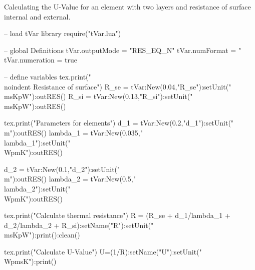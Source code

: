 \documentclass{article}
\newcommand{\msKpW}{\tfrac{m^2K}{W}}
\newcommand{\WpmsK}{\tfrac{W}{m^2K}}
\newcommand{\WpmK}{\tfrac{W}{mK}}
\newcommand{\m}{m}
\begin{document}
Calculating the U-Value for an element with two layers and resistance of surface internal and external.\\

\begin{luacode}
	-- load tVar library
	require("tVar.lua")

	-- global Definitions
	tVar.outputMode = "RES_EQ_N"
	tVar.numFormat = "%
	tVar.numeration = true
		
	-- define variables
	tex.print("\\noindent Resistance of surface")
	R_se = tVar:New(0.04,"R_{se}"):setUnit("\\msKpW"):outRES()
	R_si = tVar:New(0.13,"R_{si}"):setUnit("\\msKpW"):outRES()
	
	tex.print("Parameters for elements")
	d_1 = tVar:New(0.2,"d_1"):setUnit("\\m"):outRES()
	lambda_1 = tVar:New(0.035,"\\lambda_1"):setUnit("\\WpmK"):outRES()
	
	d_2 = tVar:New(0.1,"d_2"):setUnit("\\m"):outRES()
	lambda_2 = tVar:New(0.5,"\\lambda_2"):setUnit("\\WpmK"):outRES()
	
	tex.print("Calculate thermal resistance")
	R = (R_se + d_1/lambda_1 + d_2/lambda_2 + R_si):setName("R"):setUnit("\\msKpW"):print():clean()
	
	tex.print("Calculate U-Value")
	U=(1/R):setName("U"):setUnit("\\WpmsK"):print()
\end{luacode}
\end{document}
